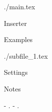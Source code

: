 ./main.tex {{{

Inserter {{{



}}}
Examples {{{








}}}

}}}
./subfile_1.tex {{{



}}}
Settings {{{



}}}
Notes {{{

- .
- .

}}}
